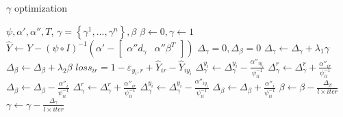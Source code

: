 \begin{algorithm}
       \caption{$\gamma$ optimization}\label{alg:1}
        \begin{algorithmic}[1]
            \REQUIRE $\psi,\alpha',\alpha'',T$,
            \ENSURE $\gamma=\left\{\gamma^1,...,\gamma^n\right\}, \beta$
            \STATE $\beta \leftarrow 0, \gamma \leftarrow 1$
                \STATE $\hat Y \leftarrow Y - {\left( {\psi \circ I} \right)^{ - 1}}\left( {\alpha' - \left[ {\begin{array}{*{20}{c}}
{\alpha''d_\gamma }&{\alpha''\beta^T }
\end{array}} \right]} \right)$
                \STATE ${\Delta _\gamma }=0, {\Delta _\beta }=0$
                	\STATE ${\Delta _\gamma }\leftarrow {\Delta _\gamma }+\lambda_1\gamma$ 
                	\STATE ${\Delta _\beta }\leftarrow {\Delta _\beta }+\lambda_2\beta$
	                    \STATE $loss_{ir} = 1 - {\varepsilon _{{y_i},r}} + {\hat Y_{ir}} - {\hat Y_{i{y_i}}}$
	                            \STATE $\Delta _\gamma^{{y_i}} \leftarrow \Delta _\gamma^{{y_i}} - \frac{{{\alpha''_{i{y_i}}}}}{{{\psi^{-1}_{ii}}}}$%
	                            \STATE $\Delta _\gamma^{{r}} \leftarrow \Delta _\gamma^{{r}} + \frac{{{\alpha''_{i{r}}}}}{{{\psi^{-1}_{ii}}}}$%
	                            \STATE ${\Delta _\beta } \leftarrow {\Delta _\beta } - \frac{{{\alpha''_i}}}{{{\psi^{-1}_{ii}}}}$
	                             \STATE $\Delta _\gamma^{{r}} \leftarrow \Delta _\gamma^{{r}} + \frac{{{\alpha''_{i{r}}}}}{{{\psi^{-1}_{ii}}}}$%
	                        \ELSE
	                            \STATE $\Delta _\gamma^{{y_i}} \leftarrow \Delta _\gamma^{{y_i}} - \frac{{{\alpha''_{i{y_i}}}}}{{{\psi^{-1}_{ii}}}}$
	                             \STATE        ${\Delta _\beta } \leftarrow {\Delta _\beta } + \frac{{{\alpha''_i}}}{{{\psi^{-1}_{ii}}}}$
	                        \ENDIF
	                    \ENDIF
	                 \ENDFOR %
                \ENDFOR %
                \STATE $\beta \leftarrow \beta - \frac{{{\Delta _\beta }}}{{l \times {iter} }}$
                \STATE $\gamma  \leftarrow \gamma  - \frac{{{\Delta _\gamma }}}{{l\times {iter} }}$
             \ENDFOR %
        \end{algorithmic}
\end{algorithm}